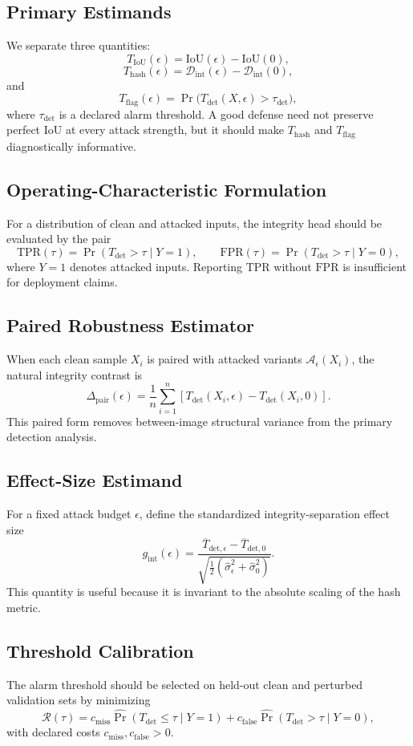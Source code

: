 \documentclass[11pt]{article}
\begin{document}
\subsection{Primary Estimands}
We separate three quantities:
\[
T_{\mathrm{IoU}}(\epsilon)=\mathrm{IoU}(\epsilon)-\mathrm{IoU}(0),
\]
\[
T_{\mathrm{hash}}(\epsilon)=\mathcal{D}_{\mathrm{int}}(\epsilon)-\mathcal{D}_{\mathrm{int}}(0),
\]
and
\[
T_{\mathrm{flag}}(\epsilon)=\Pr\!\big(T_{\mathrm{det}}(X,\epsilon)>\tau_{\mathrm{det}}\big),
\]
where $\tau_{\mathrm{det}}$ is a declared alarm threshold. A good defense need not preserve perfect IoU at every attack strength, but it should make $T_{\mathrm{hash}}$ and $T_{\mathrm{flag}}$ diagnostically informative.

\subsection{Operating-Characteristic Formulation}
For a distribution of clean and attacked inputs, the integrity head should be evaluated by the pair
\[
\mathrm{TPR}(\tau)=\Pr(T_{\mathrm{det}}>\tau\mid Y=1),
\qquad
\mathrm{FPR}(\tau)=\Pr(T_{\mathrm{det}}>\tau\mid Y=0),
\]
where $Y=1$ denotes attacked inputs. Reporting $\mathrm{TPR}$ without $\mathrm{FPR}$ is insufficient for deployment claims.

\subsection{Paired Robustness Estimator}
When each clean sample $X_i$ is paired with attacked variants $\mathcal{A}_{\epsilon}(X_i)$, the natural integrity contrast is
\[
\Delta_{\mathrm{pair}}(\epsilon)=\frac{1}{n}\sum_{i=1}^{n}\left[T_{\mathrm{det}}(X_i,\epsilon)-T_{\mathrm{det}}(X_i,0)\right].
\]
This paired form removes between-image structural variance from the primary detection analysis.

\subsection{Effect-Size Estimand}
For a fixed attack budget $\epsilon$, define the standardized integrity-separation effect size
\[
g_{\mathrm{int}}(\epsilon)=
\frac{\overline{T}_{\mathrm{det},\epsilon}-\overline{T}_{\mathrm{det},0}}
{\sqrt{\tfrac{1}{2}\left(\widehat{\sigma}_{\epsilon}^2+\widehat{\sigma}_{0}^2\right)}}.
\]
This quantity is useful because it is invariant to the absolute scaling of the hash metric.

\subsection{Threshold Calibration}
The alarm threshold should be selected on held-out clean and perturbed validation sets by minimizing
\[
\widehat{\mathcal{R}}(\tau)=c_{\mathrm{miss}}\widehat{\Pr}(T_{\mathrm{det}}\le \tau\mid Y=1)+c_{\mathrm{false}}\widehat{\Pr}(T_{\mathrm{det}}>\tau\mid Y=0),
\]
with declared costs $c_{\mathrm{miss}},c_{\mathrm{false}}>0$.
\end{document}
